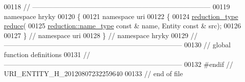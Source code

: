 \begin{DoxyCode}
00118 \textcolor{comment}{//
      ------------------------------------------------------------------------------}
00119 \textcolor{keyword}{namespace }hryky
00120 \{
00121 \textcolor{keyword}{namespace }uri
00122 \{
00124     \hyperlink{namespacehryky_a343a9a4c36a586be5c2693156200eadc}{reduction_type} \hyperlink{namespacehryky_1_1uri_ab4530b241565d82fb0768bb29031858f}{reduce}(
00125         \hyperlink{namespacehryky_1_1reduction_ac686c30a4c8d196bbd0f05629a6b921f}{reduction::name_type} \textcolor{keyword}{const} & name, Entity \textcolor{keyword}{const} & src);
00126 
00127 \} \textcolor{comment}{// namespace uri}
00128 \} \textcolor{comment}{// namespace hryky}
00129 \textcolor{comment}{//
      ------------------------------------------------------------------------------}
00130 \textcolor{comment}{// global function definitions}
00131 \textcolor{comment}{//
      ------------------------------------------------------------------------------}
00132 \textcolor{preprocessor}{#endif // URI\_ENTITY\_H\_20120807232259640}
00133 \textcolor{preprocessor}{}\textcolor{comment}{// end of file}
\end{DoxyCode}
